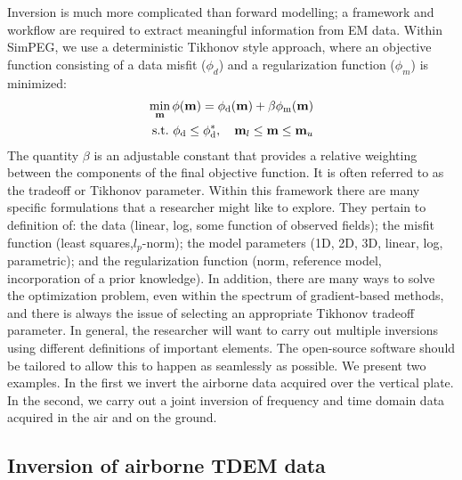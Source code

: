 \documentclass[paper]{geophysics}
\begin{document}
Inversion is much more complicated than forward modelling; a framework and  workflow are required to extract meaningful information from EM data. Within SimPEG, we use a deterministic Tikhonov style approach, where an objective function consisting of a data misfit ($\phi_d$) and a regularization function ($\phi_m$) is minimized:
\begin{equation}
\begin{split}
    \min_{\mathbf{m}} \phi(\mathbf{m}) = \phi_{\rm d}(\mathbf{m}) + \beta \phi_{\rm m}(\mathbf{m}) \\
    \text{s.t.} ~\phi_{\rm d} \leq \phi_{\rm d}^*, \quad \mathbf{m}_l \leq \mathbf{m} \leq \mathbf{m}_u
\end{split}
\label{eq:inv-prob}
\end{equation}
The quantity $\beta$ is an adjustable constant that provides a relative weighting between the components of the final objective function. It is often referred to as the tradeoff or Tikhonov parameter. Within this framework there are many specific formulations that a researcher might like to explore. They pertain to definition of: the data (linear, log, some function of observed fields); the misfit function (least squares,$l_p$-norm); the model parameters (1D, 2D, 3D, linear, log, parametric); and the regularization function (norm, reference model, incorporation of a prior knowledge). In addition, there are many ways to solve the optimization problem, even within the spectrum of gradient-based methods, and there is always the issue of selecting an appropriate Tikhonov tradeoff parameter. In general, the researcher will want to carry out multiple inversions using different definitions of important elements. The open-source software should be tailored to allow this to happen as seamlessly as possible. We present two examples. In the first we invert the airborne data acquired over the vertical plate. In the second, we carry out a joint inversion of frequency and time domain data acquired in the air and on the ground.



\subsection{Inversion of airborne TDEM data}
\end{document}
